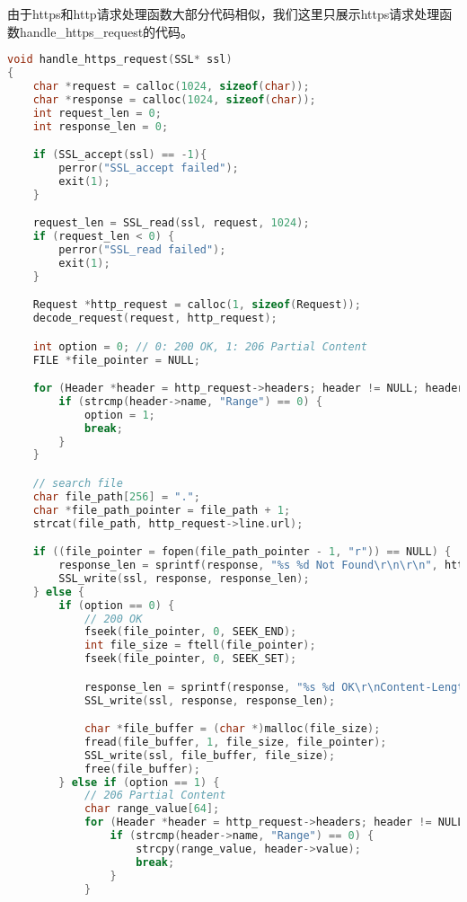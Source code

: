 \documentclass[11pt]{article}
\begin{document}
由于https和http请求处理函数大部分代码相似，我们这里只展示https请求处理函数handle\_https\_request的代码。
\begin{lstlisting}[language=C]
void handle_https_request(SSL* ssl)
{   
    char *request = calloc(1024, sizeof(char));
    char *response = calloc(1024, sizeof(char));
    int request_len = 0;
    int response_len = 0;

    if (SSL_accept(ssl) == -1){
		perror("SSL_accept failed");
		exit(1);
	}

    request_len = SSL_read(ssl, request, 1024);
    if (request_len < 0) {
        perror("SSL_read failed");
        exit(1);
    }

    Request *http_request = calloc(1, sizeof(Request));
    decode_request(request, http_request);

    int option = 0; // 0: 200 OK, 1: 206 Partial Content
    FILE *file_pointer = NULL;

    for (Header *header = http_request->headers; header != NULL; header = header->next) {
        if (strcmp(header->name, "Range") == 0) {
            option = 1;
            break;
        }
    }

    // search file
    char file_path[256] = ".";
    char *file_path_pointer = file_path + 1;
    strcat(file_path, http_request->line.url);

    if ((file_pointer = fopen(file_path_pointer - 1, "r")) == NULL) {
        response_len = sprintf(response, "%s %d Not Found\r\n\r\n", http_request->line.version, NOT_FOUND);
        SSL_write(ssl, response, response_len);
    } else {
        if (option == 0) {
            // 200 OK
            fseek(file_pointer, 0, SEEK_END);
            int file_size = ftell(file_pointer);
            fseek(file_pointer, 0, SEEK_SET);

            response_len = sprintf(response, "%s %d OK\r\nContent-Length: %d\r\n\r\n", http_request->line.version, OK, file_size);
            SSL_write(ssl, response, response_len);

            char *file_buffer = (char *)malloc(file_size);
            fread(file_buffer, 1, file_size, file_pointer);
            SSL_write(ssl, file_buffer, file_size);
            free(file_buffer);
        } else if (option == 1) {
            // 206 Partial Content
            char range_value[64];
            for (Header *header = http_request->headers; header != NULL; header = header->next) {
                if (strcmp(header->name, "Range") == 0) {
                    strcpy(range_value, header->value);
                    break;
                }
            }


\end{lstlisting}
\end{document}
